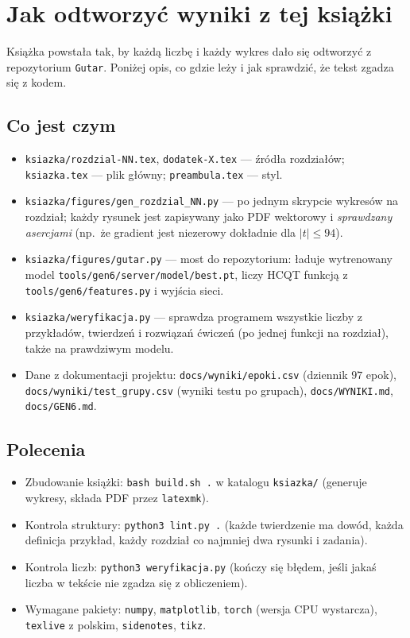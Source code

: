 \chapter{Jak odtworzyć wyniki z tej książki}\label{dod:odtwarzanie}

Książka powstała tak, by każdą liczbę i każdy wykres dało się odtworzyć z repozytorium \texttt{Gutar}. Poniżej opis, co gdzie leży i jak sprawdzić, że tekst zgadza się z kodem.

\section*{Co jest czym}
\begin{itemize}
\item \texttt{ksiazka/rozdzial-NN.tex}, \texttt{dodatek-X.tex} --- źródła rozdziałów; \texttt{ksiazka.tex} --- plik główny; \texttt{preambula.tex} --- styl.
\item \texttt{ksiazka/figures/gen\_rozdzial\_NN.py} --- po jednym skrypcie wykresów na rozdział; każdy rysunek jest zapisywany jako PDF wektorowy i \emph{sprawdzany asercjami} (np.\ że gradient jest niezerowy dokładnie dla $|t|\le94$).
\item \texttt{ksiazka/figures/gutar.py} --- most do repozytorium: ładuje wytrenowany model \texttt{tools/gen6/server/model/best.pt}, liczy HCQT funkcją z \texttt{tools/gen6/features.py} i wyjścia sieci.
\item \texttt{ksiazka/weryfikacja.py} --- sprawdza programem wszystkie liczby z przykładów, twierdzeń i rozwiązań ćwiczeń (po jednej funkcji na rozdział), także na prawdziwym modelu.
\item Dane z dokumentacji projektu: \texttt{docs/wyniki/epoki.csv} (dziennik $97$ epok), \texttt{docs/wyniki/test\_grupy.csv} (wyniki testu po grupach), \texttt{docs/WYNIKI.md}, \texttt{docs/GEN6.md}.
\end{itemize}

\section*{Polecenia}
\begin{itemize}
\item Zbudowanie książki: \texttt{bash build.sh .} w katalogu \texttt{ksiazka/} (generuje wykresy, składa PDF przez \texttt{latexmk}).
\item Kontrola struktury: \texttt{python3 lint.py .} (każde twierdzenie ma dowód, każda definicja przykład, każdy rozdział co najmniej dwa rysunki i zadania).
\item Kontrola liczb: \texttt{python3 weryfikacja.py} (kończy się błędem, jeśli jakaś liczba w tekście nie zgadza się z obliczeniem).
\item Wymagane pakiety: \texttt{numpy}, \texttt{matplotlib}, \texttt{torch} (wersja CPU wystarcza), \texttt{texlive} z polskim, \texttt{sidenotes}, \texttt{tikz}.
\end{itemize}

